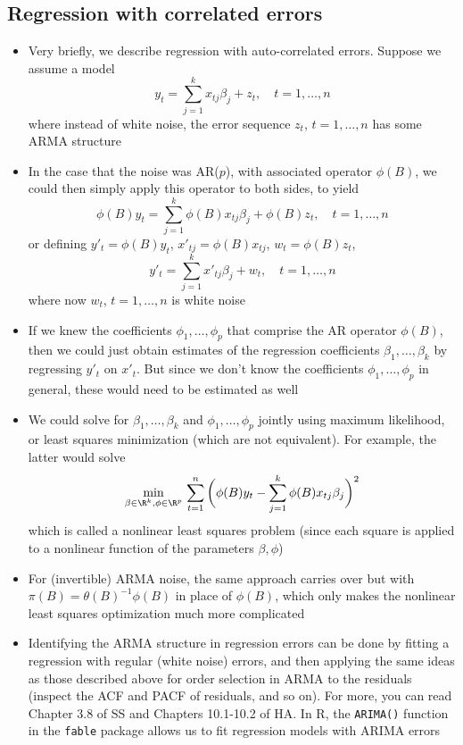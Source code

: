 \documentclass{article}
\begin{document}
\subsection{Regression with correlated errors}

\begin{itemize}
\item Very briefly, we describe regression with auto-correlated errors. Suppose
  we assume a model 
  \[
  y_t = \sum_{j=1}^k x_{tj} \beta_j + z_t, \quad t = 1,\dots,n
  \]
  where instead of white noise, the error sequence $z_t$, $t = 1,\dots,n$ has
  some ARMA structure

\item In the case that the noise was AR($p$), with associated operator
  $\phi(B)$, we could then simply apply this operator to both sides, to yield 
  \[
  \phi(B) y_t = \sum_{j=1}^k \phi(B) x_{tj} \beta_j + \phi(B) z_t, \quad t =
  1,\dots,n  
  \]
  or defining $y'_t = \phi(B) y_t$, $x'_{tj} = \phi(B) x_{tj}$, $w_t = \phi(B)
  z_t$,  
  \[
  y'_t = \sum_{j=1}^k x'_{tj} \beta_j + w_t, \quad t = 1,\dots,n
  \]
  where now $w_t$, $t = 1,\dots,n$ is white noise

\item If we knew the coefficients $\phi_1,\dots,\phi_p$ that comprise the AR
  operator $\phi(B)$, then we could just obtain estimates of the regression
  coefficients $\beta_1,\dots,\beta_k$ by regressing $y'_t$ on $x'_t$. But since
  we don't know the coefficients $\phi_1,\dots,\phi_p$ in general, these would
  need to be estimated as well

\item We could solve for $\beta_1,\dots,\beta_k$ and $\phi_1,\dots,\phi_p$
  jointly using maximum likelihood, or least squares minimization (which are not
  equivalent). For example, the latter would solve  
  \[
  \min_{\beta \in \R^k, \phi \in \R^p} \, \sum_{t=1}^n \bigg( \phi(B) y_t -
  \sum_{j=1}^k \phi(B) x_{tj} \beta_j \bigg)^2
  \]
  which is called a nonlinear least squares problem (since each square is
  applied to a nonlinear function of the parameters $\beta,\phi$)

\item For (invertible) ARMA noise, the same approach carries over but with
  $\pi(B) = \theta(B)^{-1} \phi(B)$ in place of $\phi(B)$, which only makes the
  nonlinear least squares optimization much more complicated

\item Identifying the ARMA structure in regression errors can be done by fitting
  a regression with regular (white noise) errors, and then applying the same
  ideas as those described above for order selection in ARMA to the residuals
  (inspect the ACF and PACF of residuals, and so on). For more, you can read
  Chapter 3.8 of SS and Chapters 10.1-10.2 of HA. In R, the \verb|ARIMA()|
  function in the \verb|fable| package allows us to fit regression models with
  ARIMA errors  
\end{itemize}
\end{document}
